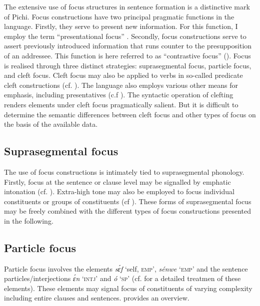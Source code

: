The extensive use of focus structures in sentence formation is a distinctive mark of Pichi. Focus constructions have two principal pragmatic functions in the language. Firstly, they serve to present new information. For this function, I employ the term “presentational focus” \citep{Drubig2003}. Secondly, focus constructions serve to assert previously introduced information that runs counter to the presupposition of an addressee. This function is here referred to as “contrastive focus” (\citealt[35]{Chafe1976}). Focus is realised through three distinct strategies: suprasegmental focus, particle focus, and cleft focus. Cleft focus may also be applied to verbs in so-called predicate cleft constructions (cf. ). The language also employs various other means for emphasis, including presentatives (c.f ). The syntactic operation of clefting renders elements under cleft focus pragmatically salient. But it is difficult to determine the semantic differences between cleft focus and other types of focus on the basis of the available data. 

\subsection{Suprasegmental focus}

The use of focus constructions is intimately tied to suprasegmental phonology. Firstly, focus at the sentence or clause level may be signalled by emphatic intonation (cf. ). Extra-high tone may also be employed to focus individual constituents or groups of constituents (cf ). These forms of suprasegmental focus may be freely combined with the different types of focus constructions presented in the following. 

\subsection{Particle focus}\label{sec:7.4.2}

Particle focus involves the elements \textit{sɛ́f} ‘self, \textsc{emp}’, \textit{sénwe} ‘\textsc{emp}’ and the sentence particles/interjections \textit{ɛ́n} ‘\textsc{intj}’ and \textit{ó} ‘\textsc{sp}’ (cf.  for a detailed treatmen of these elements). These elements may signal focus of constituents of varying complexity including entire clauses and sentences.  provides an overview. {\fff}

